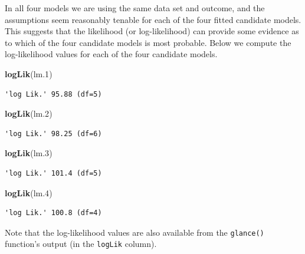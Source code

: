 \documentclass[]{book}
\newenvironment{Shaded}{\begin{snugshade}}{\end{snugshade}}
\newcommand{\FloatTok}[1]{\textcolor[rgb]{0.00,0.00,0.81}{#1}}
\newcommand{\KeywordTok}[1]{\textcolor[rgb]{0.13,0.29,0.53}{\textbf{#1}}}
\newcommand{\NormalTok}[1]{#1}
\begin{document}
In all four models we are using the same data set and outcome, and the assumptions seem reasonably tenable for each of the four fitted candidate models. This suggests that the likelihood (or log-likelihood) can provide some evidence as to which of the four candidate models is most probable. Below we compute the log-likelihood values for each of the four candidate models.

\begin{Shaded}
\begin{Highlighting}[]
\KeywordTok{logLik}\NormalTok{(lm}\FloatTok{.1}\NormalTok{)}
\end{Highlighting}
\end{Shaded}

\begin{verbatim}
'log Lik.' 95.88 (df=5)
\end{verbatim}

\begin{Shaded}
\begin{Highlighting}[]
\KeywordTok{logLik}\NormalTok{(lm}\FloatTok{.2}\NormalTok{)}
\end{Highlighting}
\end{Shaded}

\begin{verbatim}
'log Lik.' 98.25 (df=6)
\end{verbatim}

\begin{Shaded}
\begin{Highlighting}[]
\KeywordTok{logLik}\NormalTok{(lm}\FloatTok{.3}\NormalTok{)}
\end{Highlighting}
\end{Shaded}

\begin{verbatim}
'log Lik.' 101.4 (df=5)
\end{verbatim}

\begin{Shaded}
\begin{Highlighting}[]
\KeywordTok{logLik}\NormalTok{(lm}\FloatTok{.4}\NormalTok{)}
\end{Highlighting}
\end{Shaded}

\begin{verbatim}
'log Lik.' 100.8 (df=4)
\end{verbatim}

Note that the log-likelihood values are also available from the \texttt{glance()} function's output (in the \texttt{logLik} column).
\end{document}
